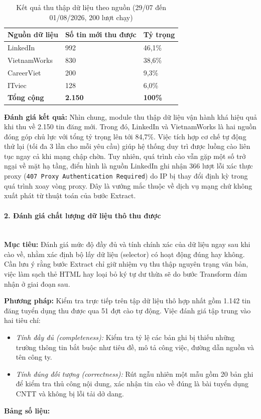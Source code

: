\begin{table}[H]
\caption{Kết quả thu thập dữ liệu theo nguồn (29/07 đến 01/08/2026, 200 lượt chạy)}
\label{tab:extract_by_source}
\centering
\begin{tabular}{|L{4.0cm}|C{3.0cm}|C{2.5cm}|}
\hline
\textbf{Nguồn dữ liệu} & \textbf{Số tin mới thu được} & \textbf{Tỷ trọng} \\
\hline
LinkedIn & 992 & 46,1\% \\
\hline
VietnamWorks & 830 & 38,6\% \\
\hline
CareerViet & 200 & 9,3\% \\
\hline
ITviec & 128 & 6,0\% \\
\hline
\textbf{Tổng cộng} & \textbf{2.150} & \textbf{100\%} \\
\hline
\end{tabular}
\end{table}
\textbf{Đánh giá kết quả:}
Nhìn chung, module thu thập dữ liệu vận hành khá hiệu quả khi thu về 2.150 tin đăng mới. Trong đó, LinkedIn và VietnamWorks là hai nguồn đóng góp chủ lực với tổng tỷ trọng lên tới 84,7\%. Việc tích hợp cơ chế tự động thử lại (tối đa 3 lần cho mỗi yêu cầu) giúp hệ thống duy trì được luồng cào liên tục ngay cả khi mạng chập chờn. Tuy nhiên, quá trình cào vẫn gặp một số trở ngại về mặt hạ tầng, điển hình là nguồn LinkedIn ghi nhận 366 lượt lỗi xác thực proxy (\texttt{407 Proxy Authentication Required}) do IP bị thay đổi định kỳ trong quá trình xoay vòng proxy. Đây là vướng mắc thuộc về dịch vụ mạng chứ không xuất phát từ thuật toán của bước Extract.

\paragraph*{2. Đánh giá chất lượng dữ liệu thô thu được}
\mbox{}\\[2pt]
\textbf{Mục tiêu:} Đánh giá mức độ đầy đủ và tính chính xác của dữ liệu ngay sau khi cào về, nhằm xác định bộ lấy dữ liệu (selector) có hoạt động đúng hay không. Cần lưu ý rằng bước Extract chỉ giữ nhiệm vụ thu thập nguyên trạng văn bản, việc làm sạch thẻ HTML hay loại bỏ ký tự dư thừa sẽ do bước Transform đảm nhận ở giai đoạn sau.

\textbf{Phương pháp:} Kiểm tra trực tiếp trên tập dữ liệu thô hợp nhất gồm 1.142 tin đăng tuyển dụng thu được qua 51 đợt cào tự động. Việc đánh giá tập trung vào hai tiêu chí:
\begin{itemize}
  \item \textit{Tính đầy đủ (completeness):} Kiểm tra tỷ lệ các bản ghi bị thiếu những trường thông tin bắt buộc như tiêu đề, mô tả công việc, đường dẫn nguồn và tên công ty.
  \item \textit{Tính đúng đối tượng (correctness):} Rút ngẫu nhiên một mẫu gồm 20 bản ghi để kiểm tra thủ công nội dung, xác nhận tin cào về đúng là bài tuyển dụng CNTT và không bị lỗi tải dở dang.
\end{itemize}
\textbf{Bảng số liệu:}

